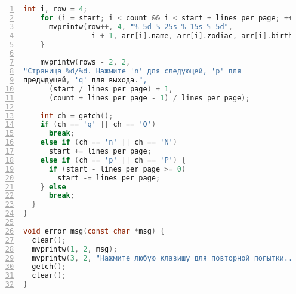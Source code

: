 \begin{lstlisting}[language=C,numbers=left]
    int i, row = 4;
    for (i = start; i < count && i < start + lines_per_page; ++i) {
      mvprintw(row++, 4, "%-5d %-25s %-15s %-5d",
                i + 1, arr[i].name, arr[i].zodiac, arr[i].birth_year);
    }

    mvprintw(rows - 2, 2,
"Страница %d/%d. Нажмите 'n' для следующей, 'p' для 
предыдущей, 'q' для выхода.",
      (start / lines_per_page) + 1,
      (count + lines_per_page - 1) / lines_per_page);

    int ch = getch();
    if (ch == 'q' || ch == 'Q')
      break;
    else if (ch == 'n' || ch == 'N')
      start += lines_per_page;
    else if (ch == 'p' || ch == 'P') {
      if (start - lines_per_page >= 0)
        start -= lines_per_page;
    } else
      break;
  }
}

void error_msg(const char *msg) {
  clear();
  mvprintw(1, 2, msg);
  mvprintw(3, 2, "Нажмите любую клавишу для повторной попытки...");
  getch();
  clear();
}
\end{lstlisting}